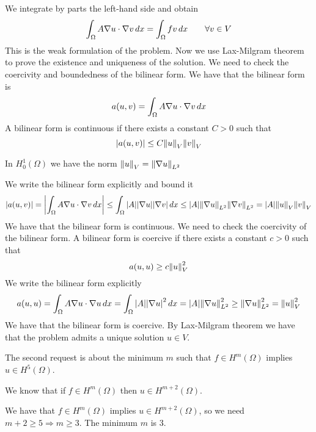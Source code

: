 We integrate by parts the left-hand side and obtain
\[
    \int_\Omega A \nabla u \cdot \nabla v \, dx = \int_\Omega f v \, dx \qquad \forall v \in V
\]
This is the weak formulation of the problem. Now we use Lax-Milgram theorem to
prove the existence and uniqueness of the solution. We need to check the
coercivity and boundedness of the bilinear form. We have that the bilinear form
is
\[
    a(u, v) = \int_\Omega A \nabla u \cdot \nabla v \, dx
\]
A bilinear form is continuous if there exists a constant \(C > 0\) such that
\[
    \abs{a(u, v)} \leq C \norm{u}_V \norm{v}_V
\]
\begin{remark}
    In \(H^1_0(\Omega)\) we have the norm \(\norm{u}_V = \norm{\nabla u}_{L^2}\)
\end{remark}
We write the bilinear form explicitly and bound it
\[
    \begin{split}
        \abs{a(u, v)} = \abs{\int_\Omega A \nabla u \cdot \nabla v \, dx} \leq \int_\Omega \abs{A} \abs{\nabla u} \abs{\nabla v} \, dx \leq \abs{A} \norm{\nabla u}_{L^2} \norm{\nabla v}_{L^2} = \abs{A} \norm{u}_V \norm{v}_V
    \end{split}
\]
We have that the bilinear form is continuous. We need to check the coercivity
of the bilinear form. A bilinear form is coercive if there exists a constant
\(c > 0\) such that
\[
    a(u, u) \geq c \norm{u}_V^2
\]
We write the bilinear form explicitly
\[
    \begin{split}
        a(u, u) = \int_\Omega A \nabla u \cdot \nabla u \, dx = \int_\Omega \abs{A} \abs{\nabla u}^2 \, dx = \abs{A} \norm{\nabla u}_{L^2}^2 \geq \norm{\nabla u}_{L^2}^2 = \norm{u}_V^2
    \end{split}
\]
We have that the bilinear form is coercive. By Lax-Milgram theorem we have that
the problem admits a unique solution \(u \in V\).

The second request is about the minimum \(m\) such that \(f \in H^m(\Omega)\)
implies \(u \in H^5(\Omega)\).
\begin{remark}
    We know that if \(f \in H^m(\Omega)\) then \(u \in H^{m+2}(\Omega)\).
\end{remark}
We have that \(f \in H^m(\Omega)\) implies \(u \in H^{m+2}(\Omega)\), so we need \(m+2 \geq 5 \Rightarrow m \geq 3\). The minimum \(m\) is 3.


